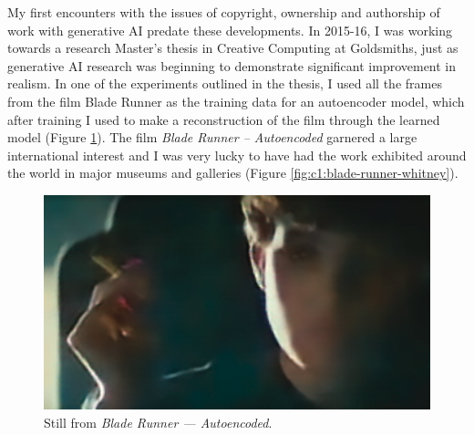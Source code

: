 My first encounters with the issues of copyright, ownership and authorship of work with generative AI predate these developments. 
In 2015-16, I was working towards a research Master's thesis in Creative Computing at Goldsmiths, just as generative AI research was beginning to demonstrate significant improvement in realism. 
In one of the experiments outlined in the thesis, I used all the frames from the film Blade Runner as the training data for an autoencoder model, which after training I used to make a reconstruction of the film through the learned model \citep{broad2016autoencoding} (Figure \ref{fig:c1:blade-runner}).
The film \textit{Blade Runner -- Autoencoded} garnered a large international interest and I was very lucky to have had the work exhibited around the world in major museums and galleries \citep{broad2017autoencoding} (Figure \ref{fig:c1:blade-runner-whitney}).

\begin{figure}[!htb]
    \centering
    \captionsetup{justification=centering}
    \includegraphics[width=1\textwidth]{figures/c1_intro/blade_runner_still.png}
    \caption{Still from \textit{Blade Runner --- Autoencoded}.}
    \label{fig:c1:blade-runner}
\end{figure}

